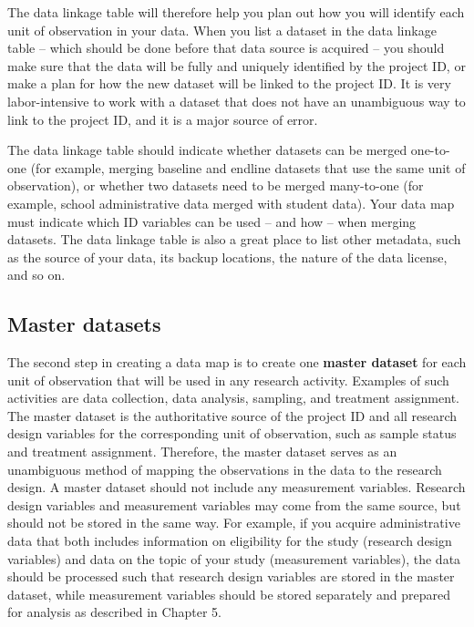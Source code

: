 The data linkage table will therefore help you plan out
how you will identify each unit of observation in your data.
When you list a dataset in the data linkage table --
which should be done before that data source is acquired --
you should make sure that the data will
be fully and uniquely identified by the project ID,
or make a plan for how the new dataset will be linked to the project ID.
It is very labor-intensive to work with a dataset that
does not have an unambiguous way to link to the project ID,
and it is a major source of error.

The data linkage table should indicate whether
datasets can be merged one-to-one (for example,
merging baseline and endline datasets
that use the same unit of observation),
or whether two datasets need to be merged many-to-one
(for example, school administrative data merged with student data).
Your data map must indicate which ID variables
can be used -- and how -- when merging datasets.
The data linkage table is also a great place to list other metadata,
such as the source of your data, its backup locations,
the nature of the data license, and so on.

\subsection{Master datasets}

The second step in creating a data map is to create one \textbf{master dataset}
for each unit of observation that will be used in any research activity.
Examples of such activities are data collection, data analysis,
sampling, and treatment assignment.
The master dataset is the authoritative source
of the project ID and all research design variables
for the corresponding unit of observation, 
such as sample status and treatment assignment.
Therefore, the master dataset serves as an unambiguous method of mapping
the observations in the data to the research design.
A master dataset should not include any measurement variables.
Research design variables and measurement variables
may come from the same source,
but should not be stored in the same way.
For example, if you acquire administrative data that both includes
information on eligibility for the study (research design variables)
and data on the topic of your study (measurement variables),
the data should be processed such that research design variables are stored in the master dataset,
while measurement variables should be stored separately and prepared for analysis
as described in Chapter 5.

